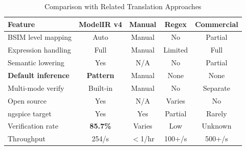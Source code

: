 \documentclass[conference]{IEEEtran}
\begin{document}
\begin{table}[!t]
\caption{Comparison with Related Translation Approaches}
\label{tab:comparison}
\centering
\renewcommand{\arraystretch}{1.2}
\begin{tabular}{@{}lcccc@{}}
\toprule
\textbf{Feature} & \textbf{ModelIR v4} & \textbf{Manual} & \textbf{Regex} & \textbf{Commercial} \\
\midrule
BSIM level mapping & Auto & Manual & No & Partial \\
Expression handling & Full & Manual & Limited & Full \\
Semantic lowering & Yes & N/A & No & Partial \\
\textbf{Default inference} & \textbf{Pattern} & Manual & None & None \\
Multi-mode verify & Built-in & Manual & No & Separate \\
Open source & Yes & N/A & Varies & No \\
ngspice target & Yes & Yes & Partial & Rarely \\
Verification rate & \textbf{85.7\%} & Varies & Low & Unknown \\
Throughput & 254/s & $<$1/hr & 100+/s & 500+/s \\
\bottomrule
\end{tabular}
\end{table}
\end{document}
